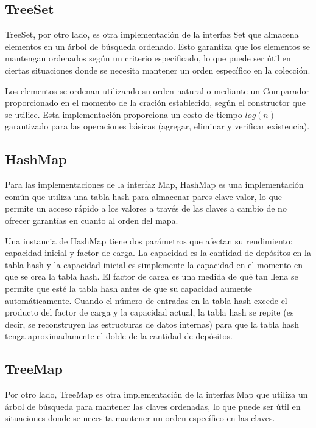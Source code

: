 \documentclass[a4paper,12pt]{article}
\begin{document}
\subsection{TreeSet}

TreeSet, por otro lado, es otra implementación de la interfaz Set que almacena elementos en un árbol de búsqueda ordenado. Esto garantiza que los elementos se mantengan ordenados según un criterio especificado, lo que puede ser útil en ciertas situaciones donde se necesita mantener un orden específico en la colección.

Los elementos se ordenan utilizando su orden natural o mediante un Comparador proporcionado en el momento de la cración establecido, según el constructor que se utilice. Esta implementación proporciona un costo de tiempo $log(n)$ garantizado para las operaciones básicas (agregar, eliminar y verificar existencia). \cite{tree_set}

\subsection{HashMap}

Para las implementaciones de la interfaz Map, HashMap es una implementación común que utiliza una tabla hash para almacenar pares clave-valor, lo que permite un acceso rápido a los valores a través de las claves a cambio de no ofrecer garantías en cuanto al orden del mapa.

Una instancia de HashMap tiene dos parámetros que afectan su rendimiento: capacidad inicial y factor de carga. La capacidad es la cantidad de depósitos en la tabla hash y la capacidad inicial es simplemente la capacidad en el momento en que se crea la tabla hash. El factor de carga es una medida de qué tan llena se permite que esté la tabla hash antes de que su capacidad aumente automáticamente. Cuando el número de entradas en la tabla hash excede el producto del factor de carga y la capacidad actual, la tabla hash se repite (es decir, se reconstruyen las estructuras de datos internas) para que la tabla hash tenga aproximadamente el doble de la cantidad de depósitos. \cite{hash_map}

\subsection{TreeMap}

Por otro lado, TreeMap es otra implementación de la interfaz Map que utiliza un árbol de búsqueda para mantener las claves ordenadas, lo que puede ser útil en situaciones donde se necesita mantener un orden específico en las claves.
\end{document}
